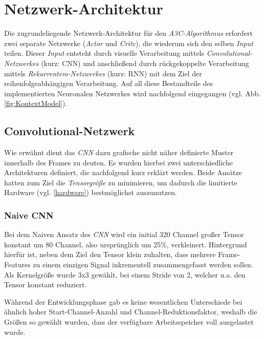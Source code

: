 \documentclass[sigconf,nonacm]{acmart}
\begin{document}
\section{Netzwerk-Architektur}
Die zugrundeliegende Netzwerk-Architektur für den \textit{A3C-Algorithmus} erfordert zwei separate Netzwerke (\textit{Actor} und \textit{Critc}), die wiederum sich den selben \textit{Input} teilen. Dieser \textit{Input} entsteht durch visuelle Verarbeitung mittels \textit{Convolutional-Netzwerkes} (kurz: CNN) und anschließend durch rückgekoppelte Verarbeitung mittels \textit{Rekurrentem-Netzwerkes} (kurz: RNN) mit dem Ziel der reihenfolgeabhängigen Verarbeitung. Auf all diese Bestandteile des implementierten Neuronalen Netzwerkes wird nachfolgend eingegangen (vgl. Abb. \ref{fig:KontextModel}).

\subsection{Convolutional-Netzwerk}
Wie erwähnt dient das \textit{CNN} dazu grafische nicht näher definierte Muster innerhalb des Frames zu deuten. Es wurden hierbei zwei unterschiedliche Architekturen definiert, die nachfolgend kurz erklärt werden. Beide Ansätze hatten zum Ziel die \textit{Tensorgröße} zu minimieren, um dadurch die limitierte Hardware (vgl. \ref{hardware}) bestmöglichst auszunutzen.

\subsubsection{Naive CNN}\hfill \break
Bei dem Naiven Ansatz des \textit{CNN} wird ein initial 320 Channel großer Tensor konstant um 80 Channel, also ursprünglich um 25\%, verkleinert. Hintergrund hierfür ist, neben dem Ziel den Tensor klein zuhalten, dass mehrere Frame-Features zu einem einzigen Signal inkrementell zusammengefasst werden sollen. Als Kernelgröße wurde 3x3 gewählt, bei einem Stride von 2, welcher u.a. den Tensor konstant reduziert.

Während der Entwicklungsphase gab es keine wesentlichen Unterschiede bei ähnlich hoher Start-Channel-Anzahl und Channel-Reduktionsfaktor, weshalb die Größen so gewählt wurden, dass der verfügbare Arbeitsspeicher voll ausgelastet wurde.
\end{document}
